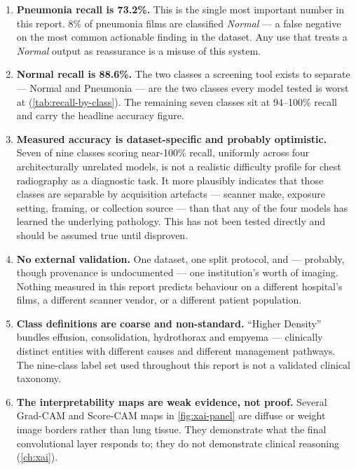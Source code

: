 \documentclass[11pt,a4paper,oneside]{report}
\begin{document}
\begin{enumerate}[label=\textbf{L\arabic*.}, leftmargin=2.2em]

\item \textbf{Pneumonia recall is 73.2\%.} This is the single most important
  number in this report. 8\% of pneumonia films are classified \emph{Normal}
  --- a false negative on the most common actionable finding in the dataset.
  Any use that treats a \emph{Normal} output as reassurance is a misuse of
  this system.

\item \textbf{Normal recall is 88.6\%.} The two classes a screening tool
  exists to separate --- Normal and Pneumonia --- are the two classes every
  model tested is worst at (\cref{tab:recall-by-class}). The remaining seven
  classes sit at 94--100\% recall and carry the headline accuracy figure.

\item \textbf{Measured accuracy is dataset-specific and probably
  optimistic.} Seven of nine classes scoring near-100\% recall, uniformly
  across four architecturally unrelated models, is not a realistic
  difficulty profile for chest radiography as a diagnostic task. It more
  plausibly indicates that those classes are separable by acquisition
  artefacts --- scanner make, exposure setting, framing, or collection
  source --- than that any of the four models has learned the underlying
  pathology. This has not been tested directly and should be assumed true
  until disproven.

\item \textbf{No external validation.} One dataset, one split protocol, and
  --- probably, though provenance is undocumented --- one institution's worth
  of imaging. Nothing measured in this report predicts behaviour on a
  different hospital's films, a different scanner vendor, or a different
  patient population.

\item \textbf{Class definitions are coarse and non-standard.} ``Higher
  Density'' bundles effusion, consolidation, hydrothorax and empyema ---
  clinically distinct entities with different causes and different
  management pathways. The nine-class label set used throughout this report
  is not a validated clinical taxonomy.

\item \textbf{The interpretability maps are weak evidence, not proof.}
  Several Grad-CAM and Score-CAM maps in \cref{fig:xai-panel} are diffuse or
  weight image borders rather than lung tissue. They demonstrate what the
  final convolutional layer responds to; they do not demonstrate clinical
  reasoning (\cref{ch:xai}).


\end{enumerate}
\end{document}
